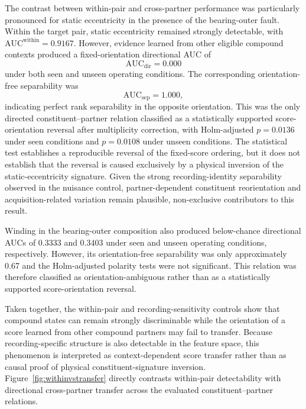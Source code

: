 The contrast between within-pair and cross-partner performance was
particularly pronounced for static eccentricity in the presence of the
bearing-outer fault. Within the target pair, static eccentricity remained
strongly detectable, with $\mathrm{AUC}^{\mathrm{within}} = 0.9167$.
However, evidence learned from other eligible compound contexts produced a
fixed-orientation directional AUC of
\begin{equation}
\mathrm{AUC}_{\mathrm{dir}} = 0.000
\end{equation}
under both seen and unseen operating conditions. The corresponding
orientation-free separability was
\begin{equation}
\mathrm{AUC}_{\mathrm{sep}} = 1.000,
\end{equation}
indicating perfect rank separability in the opposite orientation. This was
the only directed constituent--partner relation classified as a
statistically supported score-orientation reversal after multiplicity
correction, with Holm-adjusted $p = 0.0136$ under seen conditions and
$p = 0.0108$ under unseen conditions. The statistical test establishes a
reproducible reversal of the fixed-score ordering, but it does not
establish that the reversal is caused exclusively by a physical inversion
of the static-eccentricity signature. Given the strong recording-identity
separability observed in the nuisance control, partner-dependent
constituent reorientation and acquisition-related variation remain
plausible, non-exclusive contributors to this result.

Winding in the bearing-outer composition also produced below-chance
directional AUCs of 0.3333 and 0.3403 under seen and unseen operating
conditions, respectively. However, its orientation-free separability was
only approximately 0.67 and the Holm-adjusted polarity tests were not
significant. This relation was therefore classified as
orientation-ambiguous rather than as a statistically supported
score-orientation reversal.

Taken together, the within-pair and recording-sensitivity controls show
that compound states can remain strongly discriminable while the
orientation of a score learned from other compound partners may fail to
transfer. Because recording-specific structure is also detectable in the
feature space, this phenomenon is interpreted as context-dependent score
transfer rather than as causal proof of physical constituent-signature
inversion. Figure~\ref{fig:withinvstransfer} directly contrasts within-pair
detectability with directional cross-partner transfer across the evaluated
constituent--partner relations.


